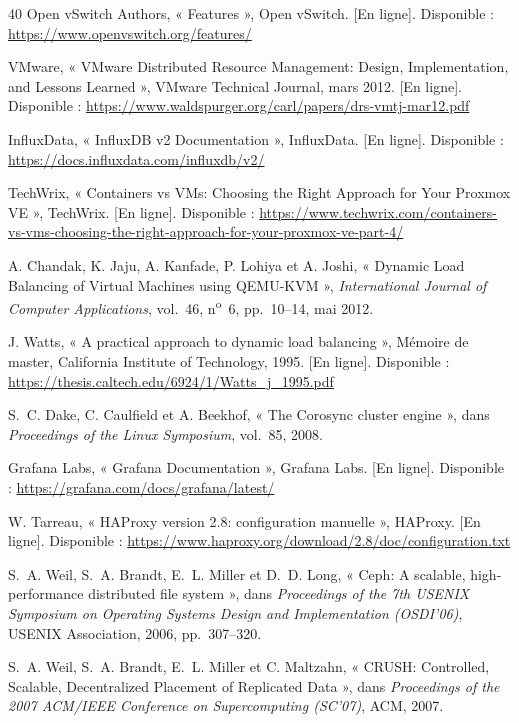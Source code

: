\begin{thebibliography}{40}
 Open vSwitch Authors, « Features », Open vSwitch. [En ligne]. Disponible : \url{https://www.openvswitch.org/features/}

 VMware, « VMware Distributed Resource Management: Design, Implementation, and Lessons Learned », VMware Technical Journal, mars 2012. [En ligne]. Disponible : \url{https://www.waldspurger.org/carl/papers/drs-vmtj-mar12.pdf}

 InfluxData, « InfluxDB v2 Documentation », InfluxData. [En ligne]. Disponible : \url{https://docs.influxdata.com/influxdb/v2/}

 TechWrix, « Containers vs VMs: Choosing the Right Approach for Your Proxmox VE », TechWrix. [En ligne]. Disponible : \url{https://www.techwrix.com/containers-vs-vms-choosing-the-right-approach-for-your-proxmox-ve-part-4/}

 A. Chandak, K. Jaju, A. Kanfade, P. Lohiya et A. Joshi, « Dynamic Load Balancing of Virtual Machines using QEMU-KVM », \textit{International Journal of Computer Applications}, vol.~46, n\textsuperscript{o}~6, pp.~10--14, mai 2012.

 J. Watts, « A practical approach to dynamic load balancing », Mémoire de master, California Institute of Technology, 1995. [En ligne]. Disponible : \url{https://thesis.caltech.edu/6924/1/Watts_j_1995.pdf}

 S.~C. Dake, C. Caulfield et A. Beekhof, « The Corosync cluster engine », dans \textit{Proceedings of the Linux Symposium}, vol.~85, 2008.

 Grafana Labs, « Grafana Documentation », Grafana Labs. [En ligne]. Disponible : \url{https://grafana.com/docs/grafana/latest/}

 W. Tarreau, « HAProxy version 2.8: configuration manuelle », HAProxy. [En ligne]. Disponible : \url{https://www.haproxy.org/download/2.8/doc/configuration.txt}

 S.~A. Weil, S.~A. Brandt, E.~L. Miller et D.~D. Long, « Ceph: A scalable, high-performance distributed file system », dans \textit{Proceedings of the 7th USENIX Symposium on Operating Systems Design and Implementation (OSDI'06)}, USENIX Association, 2006, pp.~307--320.

 S.~A. Weil, S.~A. Brandt, E.~L. Miller et C. Maltzahn, « CRUSH: Controlled, Scalable, Decentralized Placement of Replicated Data », dans \textit{Proceedings of the 2007 ACM/IEEE Conference on Supercomputing (SC'07)}, ACM, 2007.


\end{thebibliography}
